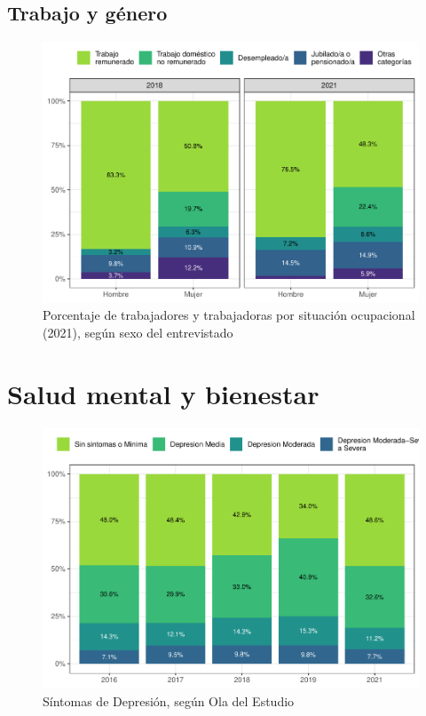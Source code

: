 \documentclass[
  12pt,
]{book}
\begin{document}
\hypertarget{trabajo-y-guxe9nero}{%
\section{Trabajo y género}\label{trabajo-y-guxe9nero}}

\begin{figure}

{\centering \includegraphics{reporte-elsoc_files/figure-latex/ocup-sexo-1} 

}

\caption{Porcentaje de trabajadores y trabajadoras por situación ocupacional (2021), según sexo del entrevistado}\label{fig:ocup-sexo}
\end{figure}

\hypertarget{salud-mental-y-bienestar}{%
\chapter{Salud mental y bienestar}\label{salud-mental-y-bienestar}}

\begin{figure}

{\centering \includegraphics{reporte-elsoc_files/figure-latex/depre-wave-1} 

}

\caption{Síntomas de Depresión, según Ola del Estudio}\label{fig:depre-wave}
\end{figure}
\end{document}
